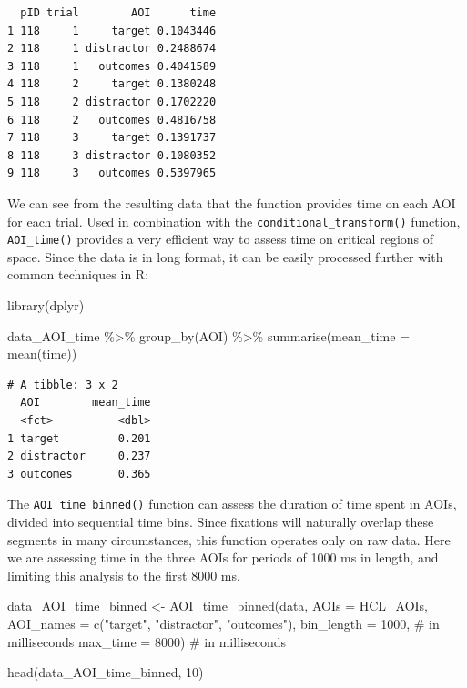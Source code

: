 \documentclass[
  man,
  floatsintext,
  longtable,
  nolmodern,
  notxfonts,
  notimes,
  colorlinks=true,linkcolor=blue,citecolor=blue,urlcolor=blue]{apa7}
\newenvironment{Shaded}{\begin{snugshade}}{\end{snugshade}}
\newcommand{\AttributeTok}[1]{\textcolor[rgb]{0.40,0.45,0.13}{#1}}
\newcommand{\CommentTok}[1]{\textcolor[rgb]{0.37,0.37,0.37}{#1}}
\newcommand{\DecValTok}[1]{\textcolor[rgb]{0.68,0.00,0.00}{#1}}
\newcommand{\FunctionTok}[1]{\textcolor[rgb]{0.28,0.35,0.67}{#1}}
\newcommand{\NormalTok}[1]{\textcolor[rgb]{0.00,0.23,0.31}{#1}}
\newcommand{\OtherTok}[1]{\textcolor[rgb]{0.00,0.23,0.31}{#1}}
\newcommand{\SpecialCharTok}[1]{\textcolor[rgb]{0.37,0.37,0.37}{#1}}
\newcommand{\StringTok}[1]{\textcolor[rgb]{0.13,0.47,0.30}{#1}}
\begin{document}
\begin{verbatim}
  pID trial        AOI      time
1 118     1     target 0.1043446
2 118     1 distractor 0.2488674
3 118     1   outcomes 0.4041589
4 118     2     target 0.1380248
5 118     2 distractor 0.1702220
6 118     2   outcomes 0.4816758
7 118     3     target 0.1391737
8 118     3 distractor 0.1080352
9 118     3   outcomes 0.5397965
\end{verbatim}

We can see from the resulting data that the function provides time on
each AOI for each trial. Used in combination with the
\texttt{conditional\_transform()} function, \texttt{AOI\_time()}
provides a very efficient way to assess time on critical regions of
space. Since the data is in long format, it can be easily processed
further with common techniques in R:

\begin{Shaded}
\begin{Highlighting}[]
\FunctionTok{library}\NormalTok{(dplyr)}

\NormalTok{data\_AOI\_time }\SpecialCharTok{\%\textgreater{}\%} 
  \FunctionTok{group\_by}\NormalTok{(AOI) }\SpecialCharTok{\%\textgreater{}\%} 
  \FunctionTok{summarise}\NormalTok{(}\AttributeTok{mean\_time =} \FunctionTok{mean}\NormalTok{(time))}
\end{Highlighting}
\end{Shaded}

\begin{verbatim}
# A tibble: 3 x 2
  AOI        mean_time
  <fct>          <dbl>
1 target         0.201
2 distractor     0.237
3 outcomes       0.365
\end{verbatim}

The \texttt{AOI\_time\_binned()} function can assess the duration of
time spent in AOIs, divided into sequential time bins. Since fixations
will naturally overlap these segments in many circumstances, this
function operates only on raw data. Here we are assessing time in the
three AOIs for periods of 1000 ms in length, and limiting this analysis
to the first 8000 ms.

\begin{Shaded}
\begin{Highlighting}[]
\NormalTok{data\_AOI\_time\_binned }\OtherTok{\textless{}{-}} 
  \FunctionTok{AOI\_time\_binned}\NormalTok{(data, }
                  \AttributeTok{AOIs =}\NormalTok{ HCL\_AOIs,}
                  \AttributeTok{AOI\_names =} \FunctionTok{c}\NormalTok{(}\StringTok{"target"}\NormalTok{, }\StringTok{"distractor"}\NormalTok{, }\StringTok{"outcomes"}\NormalTok{),}
                  \AttributeTok{bin\_length =} \DecValTok{1000}\NormalTok{, }\CommentTok{\# in milliseconds}
                  \AttributeTok{max\_time =} \DecValTok{8000}\NormalTok{) }\CommentTok{\# in milliseconds}

\FunctionTok{head}\NormalTok{(data\_AOI\_time\_binned, }\DecValTok{10}\NormalTok{)}
\end{Highlighting}
\end{Shaded}
\end{document}

